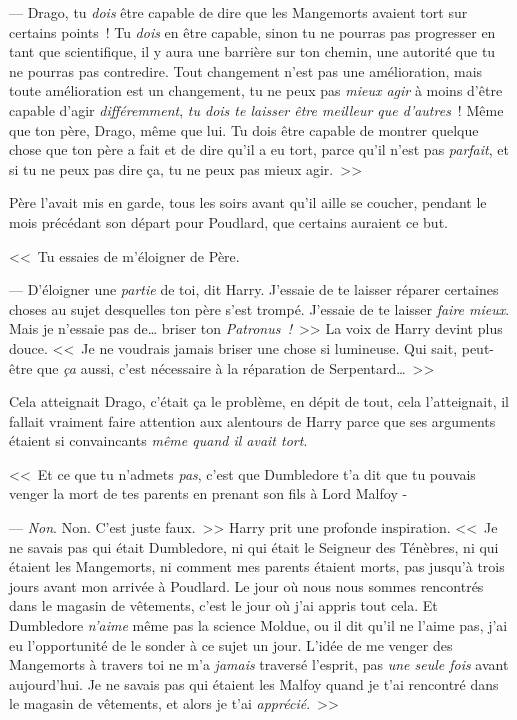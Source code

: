 --- Drago, tu \emph{dois} être capable de dire que les Mangemorts avaient tort sur certains points~! Tu \emph{dois} en être capable, sinon tu ne pourras pas progresser en tant que scientifique, il y aura une barrière sur ton chemin, une autorité que tu ne pourras pas contredire. Tout changement n'est pas une amélioration, mais toute amélioration est un changement, tu ne peux pas \emph{mieux agir} à moins d'être capable d'agir \emph{différemment}, \emph{tu dois te laisser être meilleur que d'autres}~! Même que ton père, Drago, même que lui. Tu dois être capable de montrer quelque chose que ton père a fait et de dire qu'il a eu tort, parce qu'il n'est pas \emph{parfait}, et si tu ne peux pas dire ça, tu ne peux pas mieux agir.~>>

Père l'avait mis en garde, tous les soirs avant qu'il aille se coucher, pendant le mois précédant son départ pour Poudlard, que certains auraient ce but.

<<~Tu essaies de m'éloigner de Père.

--- D'éloigner une \emph{partie} de toi, dit Harry. J'essaie de te laisser réparer certaines choses au sujet desquelles ton père s'est trompé. J'essaie de te laisser \emph{faire mieux}. Mais je n'essaie pas de… briser ton \emph{Patronus~!}~>> La voix de Harry devint plus douce. <<~Je ne voudrais jamais briser une chose si lumineuse. Qui sait, peut-être que \emph{ça} aussi, c'est nécessaire à la réparation de Serpentard…~>>

Cela atteignait Drago, c'était ça le problème, en dépit de tout, cela l'atteignait, il fallait vraiment faire attention aux alentours de Harry parce que ses arguments étaient si convaincants \emph{même quand il avait tort}.

<<~Et ce que tu n'admets \emph{pas}, c'est que Dumbledore t'a dit que tu pouvais venger la mort de tes parents en prenant son fils à Lord Malfoy -

--- \emph{Non}. Non. C'est juste faux.~>> Harry prit une profonde inspiration. <<~Je ne savais pas qui était Dumbledore, ni qui était le Seigneur des Ténèbres, ni qui étaient les Mangemorts, ni comment mes parents étaient morts, pas jusqu'à trois jours avant mon arrivée à Poudlard. Le jour où nous nous sommes rencontrés dans le magasin de vêtements, c'est le jour où j'ai appris tout cela. Et Dumbledore \emph{n'aime} même pas la science Moldue, ou il dit qu'il ne l'aime pas, j'ai eu l'opportunité de le sonder à ce sujet un jour. L'idée de me venger des Mangemorts à travers toi ne m'a \emph{jamais} traversé l'esprit, pas \emph{une seule fois} avant aujourd'hui. Je ne savais pas qui étaient les Malfoy quand je t'ai rencontré dans le magasin de vêtements, et alors je t'ai \emph{apprécié}.~>>

